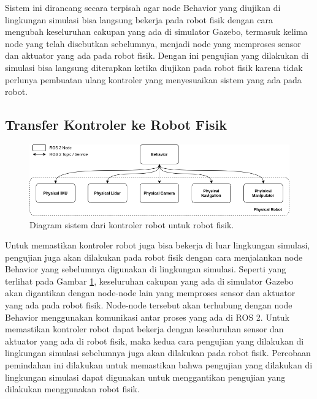 Sistem ini dirancang secara terpisah agar node Behavior yang diujikan di lingkungan simulasi bisa langsung bekerja pada robot fisik dengan cara mengubah keseluruhan cakupan yang ada di simulator Gazebo, termasuk kelima node yang telah disebutkan sebelumnya, menjadi node yang memproses sensor dan aktuator yang ada pada robot fisik.
Dengan ini pengujian yang dilakukan di simulasi bisa langsung diterapkan ketika diujikan pada robot fisik karena tidak perlunya pembuatan ulang kontroler yang menyesuaikan sistem yang ada pada robot.

\subsection{Transfer Kontroler ke Robot Fisik}

\begin{figure} [ht] \centering
  \includegraphics[scale=0.5]{gambar/transferkontroler.png}
  \caption{Diagram sistem dari kontroler robot untuk robot fisik.}
  \label{fig:transferkontroler}
\end{figure}

Untuk memastikan kontroler robot juga bisa bekerja di luar lingkungan simulasi, pengujian juga akan dilakukan pada robot fisik dengan cara menjalankan node Behavior yang sebelumnya digunakan di lingkungan simulasi.
Seperti yang terlihat pada Gambar \ref{fig:transferkontroler}, keseluruhan cakupan yang ada di simulator Gazebo akan digantikan dengan node-node lain yang memproses sensor dan aktuator yang ada pada robot fisik.
Node-node tersebut akan terhubung dengan node Behavior menggunakan komunikasi antar proses yang ada di ROS 2.
Untuk memastikan kontroler robot dapat bekerja dengan keseluruhan sensor dan aktuator yang ada di robot fisik, maka kedua cara pengujian yang dilakukan di lingkungan simulasi sebelumnya juga akan dilakukan pada robot fisik.
Percobaan pemindahan ini dilakukan untuk memastikan bahwa pengujian yang dilakukan di lingkungan simulasi dapat digunakan untuk menggantikan pengujian yang dilakukan menggunakan robot fisik.
